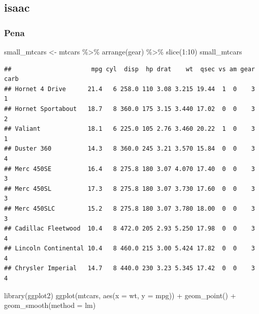 \documentclass[
]{article}
\newenvironment{Shaded}{\begin{snugshade}}{\end{snugshade}}
\newcommand{\AttributeTok}[1]{\textcolor[rgb]{0.77,0.63,0.00}{#1}}
\newcommand{\DecValTok}[1]{\textcolor[rgb]{0.00,0.00,0.81}{#1}}
\newcommand{\FunctionTok}[1]{\textcolor[rgb]{0.00,0.00,0.00}{#1}}
\newcommand{\NormalTok}[1]{#1}
\newcommand{\OtherTok}[1]{\textcolor[rgb]{0.56,0.35,0.01}{#1}}
\newcommand{\SpecialCharTok}[1]{\textcolor[rgb]{0.00,0.00,0.00}{#1}}
\begin{document}
\hypertarget{isaac}{%
\subsection{isaac}\label{isaac}}

\hypertarget{pena}{%
\subsubsection{Pena}\label{pena}}

\begin{Shaded}
\begin{Highlighting}[]
\NormalTok{small\_mtcars }\OtherTok{\textless{}{-}}
\NormalTok{mtcars }\SpecialCharTok{\%\textgreater{}\%}
\FunctionTok{arrange}\NormalTok{(gear) }\SpecialCharTok{\%\textgreater{}\%}
\FunctionTok{slice}\NormalTok{(}\DecValTok{1}\SpecialCharTok{:}\DecValTok{10}\NormalTok{)}
\NormalTok{small\_mtcars}
\end{Highlighting}
\end{Shaded}

\begin{verbatim}
##                      mpg cyl  disp  hp drat    wt  qsec vs am gear carb
## Hornet 4 Drive      21.4   6 258.0 110 3.08 3.215 19.44  1  0    3    1
## Hornet Sportabout   18.7   8 360.0 175 3.15 3.440 17.02  0  0    3    2
## Valiant             18.1   6 225.0 105 2.76 3.460 20.22  1  0    3    1
## Duster 360          14.3   8 360.0 245 3.21 3.570 15.84  0  0    3    4
## Merc 450SE          16.4   8 275.8 180 3.07 4.070 17.40  0  0    3    3
## Merc 450SL          17.3   8 275.8 180 3.07 3.730 17.60  0  0    3    3
## Merc 450SLC         15.2   8 275.8 180 3.07 3.780 18.00  0  0    3    3
## Cadillac Fleetwood  10.4   8 472.0 205 2.93 5.250 17.98  0  0    3    4
## Lincoln Continental 10.4   8 460.0 215 3.00 5.424 17.82  0  0    3    4
## Chrysler Imperial   14.7   8 440.0 230 3.23 5.345 17.42  0  0    3    4
\end{verbatim}

\begin{Shaded}
\begin{Highlighting}[]
\FunctionTok{library}\NormalTok{(ggplot2)}
\FunctionTok{ggplot}\NormalTok{(mtcars, }\FunctionTok{aes}\NormalTok{(}\AttributeTok{x =}\NormalTok{ wt, }\AttributeTok{y =}\NormalTok{ mpg)) }\SpecialCharTok{+}
\FunctionTok{geom\_point}\NormalTok{() }\SpecialCharTok{+}
\FunctionTok{geom\_smooth}\NormalTok{(}\AttributeTok{method =}\NormalTok{ lm)}
\end{Highlighting}
\end{Shaded}
\end{document}
